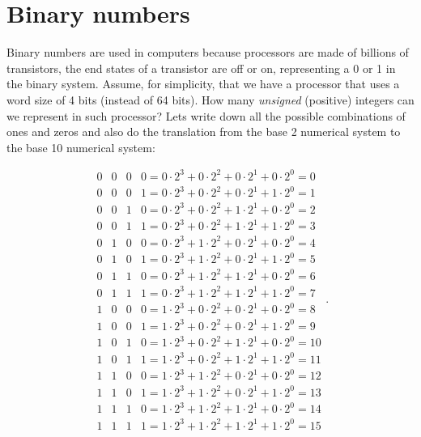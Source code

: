 \documentclass[graybox,sectrefs,envcountresetchap,open=right,final]{svmonodo}
\begin{document}
\section{Binary numbers}
Binary numbers are used in computers because processors are made of billions of transistors, the end states of a transistor are off or on, representing a 0 or 1 in the binary system. Assume, for simplicity, that we have a processor that uses a word size of 4 bits (instead of 64 bits). How many \emph{unsigned} (positive) integers can we represent in such processor? Lets write down all the possible combinations of ones and zeros and also do the translation from the base 2 numerical system to the base 10 numerical system:

\begin{equation}
\begin{matrix}
0&0&0&0=0\cdot 2^3+0\cdot 2^2+0\cdot 2^1+0\cdot 2^0=0\\ 
0&0&0&1=0\cdot 2^3+0\cdot 2^2+0\cdot 2^1+1\cdot 2^0=1\\ 
0&0&1&0=0\cdot 2^3+0\cdot 2^2+1\cdot 2^1+0\cdot 2^0=2\\ 
0&0&1&1=0\cdot 2^3+0\cdot 2^2+1\cdot 2^1+1\cdot 2^0=3\\ 
0&1&0&0=0\cdot 2^3+1\cdot 2^2+0\cdot 2^1+0\cdot 2^0=4\\ 
0&1&0&1=0\cdot 2^3+1\cdot 2^2+0\cdot 2^1+1\cdot 2^0=5\\ 
0&1&1&0=0\cdot 2^3+1\cdot 2^2+1\cdot 2^1+0\cdot 2^0=6\\ 
0&1&1&1=0\cdot 2^3+1\cdot 2^2+1\cdot 2^1+1\cdot 2^0=7\\ 
1&0&0&0=1\cdot 2^3+0\cdot 2^2+0\cdot 2^1+0\cdot 2^0=8\\ 
1&0&0&1=1\cdot 2^3+0\cdot 2^2+0\cdot 2^1+1\cdot 2^0=9\\ 
1&0&1&0=1\cdot 2^3+0\cdot 2^2+1\cdot 2^1+0\cdot 2^0=10\\ 
1&0&1&1=1\cdot 2^3+0\cdot 2^2+1\cdot 2^1+1\cdot 2^0=11\\ 
1&1&0&0=1\cdot 2^3+1\cdot 2^2+0\cdot 2^1+0\cdot 2^0=12\\ 
1&1&0&1=1\cdot 2^3+1\cdot 2^2+0\cdot 2^1+1\cdot 2^0=13\\ 
1&1&1&0=1\cdot 2^3+1\cdot 2^2+1\cdot 2^1+0\cdot 2^0=14\\ 
1&1&1&1=1\cdot 2^3+1\cdot 2^2+1\cdot 2^1+1\cdot 2^0=15
\end{matrix}
.
\label{eq:taylor:bin4}
\end{equation}
\end{document}
